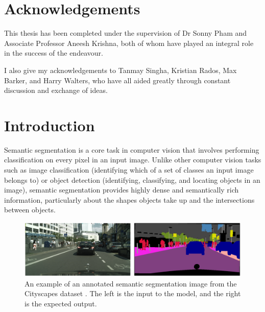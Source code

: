 \documentclass[a4paper,12pt]{report}
\begin{document}
\newpage
\chapter*{Acknowledgements}
This thesis has been completed under the supervision of Dr Sonny Pham and Associate Professor Aneesh Krishna, both of whom have played an integral role in the success of the endeavour.

\noindent I also give my acknowledgements to Tanmay Singha, Kristian Rados, Max Barker, and Harry Walters, who have all aided greatly through constant discussion and exchange of ideas.

\newpage
\tableofcontents
\newpage
\listoffigures
\newpage
\listoftables
\newpage
\thispagestyle{empty}

% 
% 

\chapter{Introduction}
Semantic segmentation is a core task in computer vision that involves performing classification on every pixel in an input image. Unlike other computer vision tasks such as image classification (identifying which of a set of classes an input image belongs to) or object detection (identifying, classifying, and locating objects in an image), semantic segmentation provides highly dense and semantically rich information, particularly about the shapes objects take up and the intersections between objects.

\begin{figure}[h]
    \centering
    \includegraphics[width=\textwidth]{res/cityscapes-segmentation-sample.png}
    \caption{An example of an annotated semantic segmentation image from the Cityscapes dataset \cite{cordts_cityscapes_2016}. The left is the input to the model, and the right is the expected output.}
    \label{fig:cityscapes_segmentation_example}
\end{figure}
\end{document}

